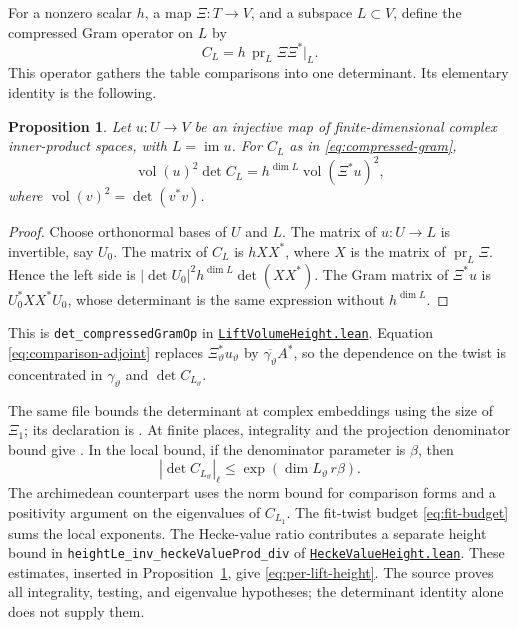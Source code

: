 \documentclass[11pt,oneside,openany]{amsbook}
\newtheorem{proposition}[theorem]{Proposition}
\theoremstyle{remark}
\numberwithin{equation}{section}
\newcommand{\ghroot}{https://github.com/lsernau/grh-lean/blob/}
\newcommand{\ghrev}{72fead102f663d5c7a407964a13dc0cf9d977207}
\newcommand{\leanfile}[2]{%
  \href{\ghroot\ghrev/grh-compact/src/#1}{\nolinkurl{#2}}}
\begin{document}
For a nonzero scalar $h$, a map $\Xi:T\to V$, and a
subspace $L\subset V$, define the compressed Gram
operator on $L$ by
\begin{equation}
\label{eq:compressed-gram}
C_L=h\,\operatorname{pr}_L\Xi\Xi^*|_L.
\end{equation}
This operator gathers the table comparisons into one
determinant. Its elementary identity is the following.
\begin{proposition}
\label{prop:compressed-det}
Let $u:U\to V$ be an injective map of finite-dimensional
complex inner-product spaces, with $L=\operatorname{im}u$.
For $C_L$ as in \eqref{eq:compressed-gram},
\[
\operatorname{vol}(u)^2\det C_L
 =h^{\dim L}\operatorname{vol}(\Xi^*u)^2,
\]
where $\operatorname{vol}(v)^2=\det(v^*v)$.
\end{proposition}
\begin{proof}
Choose orthonormal bases of $U$ and $L$. The matrix
of $u:U\to L$ is invertible, say $U_0$. The matrix
of $C_L$ is $hXX^*$, where $X$ is the matrix of
$\operatorname{pr}_L\Xi$. Hence the left side is
$|\det U_0|^2h^{\dim L}\det(XX^*)$. The Gram matrix
of $\Xi^*u$ is $U_0^*XX^*U_0$, whose determinant is
the same expression without $h^{\dim L}$.
\end{proof}
This is \texttt{det\_compressedGramOp} in
\leanfile{New/Rows/LiftVolumeHeight.lean}%
{LiftVolumeHeight.lean}. Equation
\eqref{eq:comparison-adjoint} replaces
$\Xi_\vartheta^*u_\vartheta$ by
$\overline{\gamma_\vartheta}A^*$, so the dependence
on the twist is concentrated in $\gamma_\vartheta$
and $\det C_{L_\vartheta}$.

The same file bounds the determinant at complex
embeddings using the size of $\Xi_1$; its declaration
is .
At finite places, integrality and the projection
denominator bound give
.
In the local bound, if the denominator
parameter is $\beta$, then
\begin{equation}
\label{eq:compressed-local}
|\det C_{L_\vartheta}|_\ell
 \le\exp(\dim L_\vartheta\, r\beta).
\end{equation}
The archimedean counterpart uses the norm bound for
comparison forms and a positivity argument on the
eigenvalues of $C_{L_1}$. The fit-twist budget
\eqref{eq:fit-budget} sums the local exponents.
The Hecke-value ratio contributes a separate height
bound in \texttt{heightLe\_inv\_heckeValueProd\_div}
of \leanfile{New/Rows/HeckeValueHeight.lean}%
{HeckeValueHeight.lean}. These estimates, inserted in
Proposition~\ref{prop:compressed-det}, give
\eqref{eq:per-lift-height}. The source proves all
integrality, testing, and eigenvalue hypotheses; the
determinant identity alone does not supply them.
\end{document}

